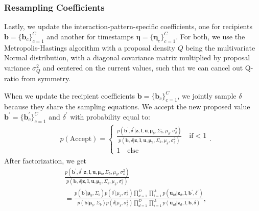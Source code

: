 \documentclass[twoside]{article}
\begin{document}
  	  \subsubsection{Resampling Coefficients}  \label{subsubsec: Resampling Coefficients}
  Lastly, we update the interaction-pattern-specific coefficients, one for recipients $\boldsymbol{b} =\{\boldsymbol{b}_c\}_{c=1}^C$ and another for timestamps $\boldsymbol{\eta} =\{\boldsymbol{\eta}_c\}_{c=1}^C$.
  	  For both, we use the Metropolis-Hastings algorithm with a proposal
density $Q$ being the multivariate Normal distribution, with a diagonal covariance matrix multiplied by proposal variance $\sigma^2_Q$ and centered on the current values, such that we can cancel out Q-ratio from symmetry.

When we update the recipient coefficients $\boldsymbol{b} =\{\boldsymbol{b}_c\}_{c=1}^C$, we jointly sample $\delta$ because they share the sampling equations. We accept the new proposed value $\boldsymbol{b}^\prime =\{\boldsymbol{b}^\prime_c\}_{c=1}^C$ and $\delta^\prime$ with probability equal to:
   \begin{equation*}
   \begin{split}
   & p(\mbox{Accept})=
   \begin{cases}  \frac{p(\boldsymbol{b}^\prime, \delta^\prime|\boldsymbol{z},  \boldsymbol{l},\boldsymbol{u},  \boldsymbol{\mu}_b, \Sigma_b, \mu_\delta, \sigma^2_\delta)}{p(\boldsymbol{b}, \delta|\boldsymbol{z},  \boldsymbol{l},\boldsymbol{u},  \boldsymbol{\mu}_b, \Sigma_b, \mu_\delta, \sigma^2_\delta)}\quad\text{if}  <1\\
   1 \quad \text{else}
   \end{cases}.
   \end{split}
   \end{equation*}
   After factorization, we get 
     	     \begin{equation*}
     	     \begin{aligned} 
     	     &\frac{p(\boldsymbol{b}^\prime, \delta^\prime|\boldsymbol{z},  \boldsymbol{l},\boldsymbol{u},  \boldsymbol{\mu}_b, \Sigma_b, \mu_\delta, \sigma^2_\delta)}{p(\boldsymbol{b}, \delta|\boldsymbol{z},  \boldsymbol{l},\boldsymbol{u},  \boldsymbol{\mu}_b, \Sigma_b, \mu_\delta, \sigma^2_\delta)}
     	     \\& = \frac{p(\boldsymbol{b}^\prime|\boldsymbol{\mu}_b, \Sigma_b) p(\delta^\prime|\mu_\delta, \sigma^2_\delta)\prod\limits_{d=1}^D\prod\limits_{i=1}^A p(\boldsymbol{u}_{id}| \boldsymbol{z}_d,  \boldsymbol{l}, \boldsymbol{b}^\prime, \delta^\prime)}{p(\boldsymbol{b}|\boldsymbol{\mu}_b, \Sigma_b) p(\delta|\mu_\delta, \sigma^2_\delta)\prod\limits_{d=1}^D\prod\limits_{i=1}^A p(\boldsymbol{u}_{id}| \boldsymbol{z}_d,  \boldsymbol{l}, \boldsymbol{b}, \delta)},
     	        \end{aligned}
     	    \end{equation*}
\end{document}
